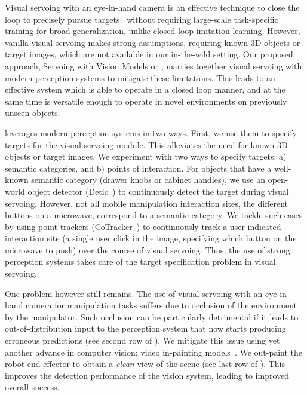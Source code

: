 Visual servoing with an eye-in-hand camera is an effective
technique to close the loop to precisely pursue
targets~\cite{chaumette2016visual}
without requiring large-scale task-specific training for broad generalization, 
unlike closed-loop imitation learning.
However, vanilla visual servoing makes
strong assumptions, \eg requiring known 3D objects or target images, which are
not available in our in-the-wild setting. Our proposed approach, Servoing with 
Vision Models or \name, marries together
visual servoing with modern perception systems to mitigate these limitations.
This leads to an effective system which is able to operate in a closed loop
manner, and at the same time is versatile enough to operate in novel
environments on previously unseen objects.

\name leverages modern perception systems in two ways. First, we use them to
specify targets for the visual servoing module. This alleviates the need for
known 3D objects or target images. We experiment with two ways to specify
targets: a) semantic categories, and b) points of interaction. For objects that
have a well-known semantic category (\eg drawer knobs or cabinet handles), we
use an open-world object detector (\eg Detic~\cite{zhou2022detecting}) to
continuously detect the target during visual servoing. However, not all mobile manipulation interaction sites, \eg the different buttons on a microwave, correspond to a semantic
category. We tackle such cases by using point trackers (\eg CoTracker~\cite{karaev2023cotracker}) to continuously track a user-indicated interaction site (\eg a single user click in the image, specifying which button on the microwave to push) over the course of visual servoing. Thus, the use of strong perception systems takes care of the target specification problem in visual servoing.

One problem however still remains. The use of visual servoing with an eye-in-hand
camera for manipulation tasks suffers due
to occlusion of the environment by the manipulator. Such occlusion can be
particularly detrimental if it leads to out-of-distribution input to the
perception system that now starts producing erroneous predictions (see
second row of ). We mitigate this issue using yet another advance in
computer vision: video in-painting models~\cite{chang2023look,
zhou2023propainter, lee2019copy}. We out-paint the robot end-effector to obtain
a \textit{clean} view of the scene (see last row of ). This improves the
detection performance of the vision system, leading to improved overall
success.


